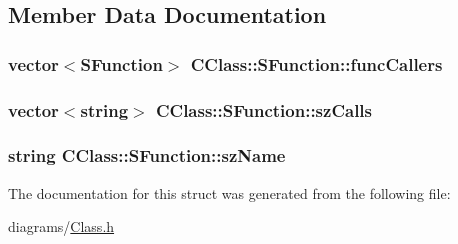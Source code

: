 \subsection{Member Data Documentation}
\hypertarget{struct_c_class_1_1_s_function_a7ac14ba0820fd54ae22e34f2e88fe2e9}{
\subsubsection[{func\+Callers}]{\setlength{\rightskip}{0pt plus 5cm}vector$<${\bf S\+Function}$>$ C\+Class\+::\+S\+Function\+::func\+Callers}}\label{struct_c_class_1_1_s_function_a7ac14ba0820fd54ae22e34f2e88fe2e9}
\hypertarget{struct_c_class_1_1_s_function_a389c0be3f14b06b53b919ba6e4eb7063}{
\subsubsection[{sz\+Calls}]{\setlength{\rightskip}{0pt plus 5cm}vector$<$string$>$ C\+Class\+::\+S\+Function\+::sz\+Calls}}\label{struct_c_class_1_1_s_function_a389c0be3f14b06b53b919ba6e4eb7063}
\hypertarget{struct_c_class_1_1_s_function_a709a1e1916aa5921620198effa41c8b5}{
\subsubsection[{sz\+Name}]{\setlength{\rightskip}{0pt plus 5cm}string C\+Class\+::\+S\+Function\+::sz\+Name}}\label{struct_c_class_1_1_s_function_a709a1e1916aa5921620198effa41c8b5}


The documentation for this struct was generated from the following file\+:\begin{DoxyCompactItemize}
\item 
diagrams/\hyperlink{_class_8h}{Class.\+h}\end{DoxyCompactItemize}
